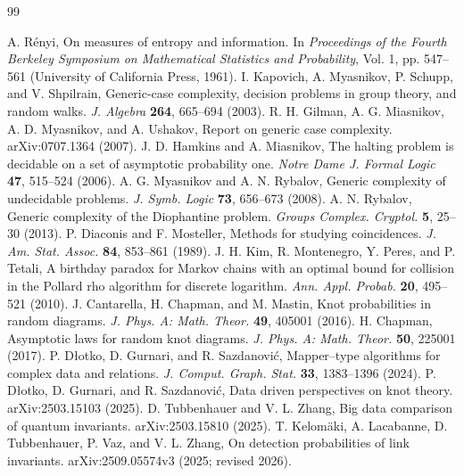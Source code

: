\documentclass[9pt,twoside]{pnas-new}
\theoremstyle{definition}
\theoremstyle{remark}
\begin{document}
\begin{thebibliography}{99}

A. R\'enyi, On measures of entropy and information. In \emph{Proceedings of the Fourth Berkeley Symposium on Mathematical Statistics and Probability}, Vol. 1, pp. 547--561 (University of California Press, 1961).
I. Kapovich, A. Myasnikov, P. Schupp, and V. Shpilrain, Generic-case complexity, decision problems in group theory, and random walks. \emph{J. Algebra} \textbf{264}, 665--694 (2003).
R. H. Gilman, A. G. Miasnikov, A. D. Myasnikov, and A. Ushakov, Report on generic case complexity. arXiv:0707.1364 (2007).
J. D. Hamkins and A. Miasnikov, The halting problem is decidable on a set of asymptotic probability one. \emph{Notre Dame J. Formal Logic} \textbf{47}, 515--524 (2006).
A. G. Myasnikov and A. N. Rybalov, Generic complexity of undecidable problems. \emph{J. Symb. Logic} \textbf{73}, 656--673 (2008).
A. N. Rybalov, Generic complexity of the Diophantine problem. \emph{Groups Complex. Cryptol.} \textbf{5}, 25--30 (2013).
P. Diaconis and F. Mosteller, Methods for studying coincidences. \emph{J. Am. Stat. Assoc.} \textbf{84}, 853--861 (1989).
J. H. Kim, R. Montenegro, Y. Peres, and P. Tetali, A birthday paradox for Markov chains with an optimal bound for collision in the Pollard rho algorithm for discrete logarithm. \emph{Ann. Appl. Probab.} \textbf{20}, 495--521 (2010).
J. Cantarella, H. Chapman, and M. Mastin, Knot probabilities in random diagrams. \emph{J. Phys. A: Math. Theor.} \textbf{49}, 405001 (2016).
H. Chapman, Asymptotic laws for random knot diagrams. \emph{J. Phys. A: Math. Theor.} \textbf{50}, 225001 (2017).
P. D{\l}otko, D. Gurnari, and R. Sazdanovi\'c, Mapper--type algorithms for complex data and relations. \emph{J. Comput. Graph. Stat.} \textbf{33}, 1383--1396 (2024).
P. D{\l}otko, D. Gurnari, and R. Sazdanovi\'c, Data driven perspectives on knot theory. arXiv:2503.15103 (2025).
D. Tubbenhauer and V. L. Zhang, Big data comparison of quantum invariants. arXiv:2503.15810 (2025).
T. Kelom\"aki, A. Lacabanne, D. Tubbenhauer, P. Vaz, and V. L. Zhang, On detection probabilities of link invariants. arXiv:2509.05574v3 (2025; revised 2026).

\end{thebibliography}
\end{document}
